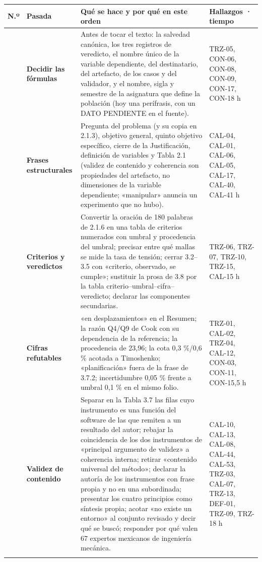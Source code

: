 {\small\begin{longtable}{@{}L{0.7cm}L{3.8cm}L{7.9cm}L{2.6cm}@{}}\toprule
\sffamily\bfseries N.º & \sffamily\bfseries Pasada & \sffamily\bfseries Qué se hace y por qué en este orden & \sffamily\bfseries Hallazgos · tiempo\\\midrule\endhead\bottomrule{} & \textbf{Decidir las fórmulas} & Antes de tocar el texto: la salvedad canónica, los tres registros de veredicto, el nombre único de la variable dependiente, del destinatario, del artefacto, de los casos y del validador, y el nombre, sigla y semestre de la asignatura que define la población (hoy una perífrasis, con un DATO PENDIENTE en el fuente). & TRZ-05, CON-06, CON-08, CON-09, CON-17, CON-18 h\\ & \textbf{Frases estructurales} & Pregunta del problema (y su copia en 2.1.3), objetivo general, quinto objetivo específico, cierre de la Justificación, definición de variables y Tabla 2.1 (validez de contenido y coherencia son propiedades del artefacto, no dimensiones de la variable dependiente; «manipular» anuncia un experimento que no hubo). & CAL-04, CAL-01, CAL-06, CAL-05, CAL-17, CAL-40, CAL-41 h\\ & \textbf{Criterios y veredictos} & Convertir la oración de 180 palabras de 2.1.6 en una tabla de criterios numerados con umbral y procedencia del umbral; precisar entre qué mallas se mide la tasa de tensión; cerrar 3.2–3.5 con «criterio, observado, se cumple»; sustituir la prosa de 3.8 por la tabla criterio–umbral–cifra–veredicto; declarar las componentes secundarias. & TRZ-06, TRZ-07, TRZ-10, TRZ-15, CAL-15 h\\ & \textbf{Cifras refutables} & «en desplazamientos» en el Resumen; la razón Q4/\allowbreak{}Q9 de Cook con su dependencia de la referencia; la procedencia de 23,96; la cota 0,3 \%/\allowbreak{}0,6 \% acotada a Timoshenko; «planificación» fuera de la frase de 3.7.2; incertidumbre 0,05 \% frente a umbral 0,1 \% en el mismo folio. & TRZ-01, CAL-02, TRZ-04, CAL-12, CON-03, CON-11, CON-15,5 h\\ & \textbf{Validez de contenido} & Separar en la Tabla 3.7 las filas cuyo instrumento es una función del software de las que remiten a un resultado del autor; rebajar la coincidencia de los dos instrumentos de «principal argumento de validez» a coherencia interna; retirar «contenido universal del método»; declarar la autoría de los instrumentos con frase propia y no en una subordinada; presentar los cuatro principios como síntesis propia; acotar «no existe un entorno» al conjunto revisado y decir qué se buscó; responder por qué valen 67 expertos mexicanos de ingeniería mecánica. & CAL-10, CAL-13, CAL-08, CAL-44, CAL-53, TRZ-03, CAL-07, TRZ-13, DEF-01, TRZ-09, TRZ-18 h\\\addlinespace[4pt]

\end{longtable}}
